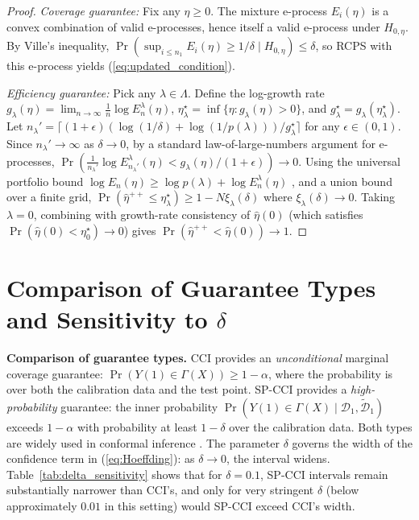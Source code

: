 \documentclass{article}
\theoremstyle{plain}
\theoremstyle{definition}
\theoremstyle{remark}
\begin{document}
\begin{proof}
\emph{Coverage guarantee:}
Fix any $\eta \ge 0$. The mixture e-process $E_i(\eta)$ is a convex combination of valid e-processes, hence itself a valid e-process under $H_{0,\eta}$. By Ville's inequality,
$\Pr\left(\sup_{i \le n_1} E_i(\eta) \ge 1/\delta \mid H_{0,\eta}\right)\le \delta$,
so RCPS with this e-process yields (\ref{eq:updated_condition}).

\emph{Efficiency guarantee:} Pick any $\lambda\in\Lambda$.
Define the log-growth rate $g_\lambda(\eta) = \lim_{n\to\infty}\frac{1}{n}\log E^{\lambda}_n(\eta)$,
$\eta_\lambda^\star = \inf\{ \eta : g_\lambda(\eta) > 0 \}$,
and $g_\lambda^\star = g_\lambda(\eta_\lambda^\star)$.
Let $n_\lambda' = \lceil(1+\epsilon)(\log(1/\delta)+\log(1/p(\lambda)))/g_\lambda^\star\rceil$ for any $\epsilon\in(0,1)$.
Since $n_\lambda'\to\infty$ as $\delta\to 0$, by a standard law-of-large-numbers argument for e-processes,
$\Pr(\frac{1}{n_\lambda'}\log E_{n_\lambda'}^\lambda(\eta) < g_\lambda(\eta)/(1+\epsilon))\to 0$.
Using the universal portfolio bound $\log E_n(\eta)\ge \log p(\lambda)+\log E_n^\lambda(\eta)$ \citep{cover1991universal},
and a union bound over a finite grid, $\Pr(\hat{\eta}^{++}\le \eta_\lambda^\star)\ge 1-N\xi_\lambda(\delta)$ where $\xi_\lambda(\delta)\to 0$.
Taking $\lambda=0$, combining with growth-rate consistency of $\hat\eta(0)$ (which satisfies $\Pr(\hat\eta(0) < \eta_0^\star)\to 0$) gives $\Pr(\hat{\eta}^{++} < \hat{\eta}(0))\to 1$.
\end{proof}


\section{Comparison of Guarantee Types and Sensitivity to $\delta$}
\label{appendix:delta_sensitivity}

\textbf{Comparison of guarantee types.} CCI \citep{lei2021conformal} provides an \emph{unconditional} marginal coverage guarantee: $\Pr(Y(1)\in\Gamma(X))\ge 1-\alpha$, where the probability is over both the calibration data and the test point. SP-CCI provides a \emph{high-probability} guarantee: the inner probability $\Pr(Y(1)\in\Gamma(X)\mid\mathcal{D}_1,\tilde{\mathcal{D}}_1)$ exceeds $1-\alpha$ with probability at least $1-\delta$ over the calibration data. Both types are widely used in conformal inference \citep{bates2021distribution}. The parameter $\delta$ governs the width of the confidence term in (\ref{eq:Hoeffding}): as $\delta\to 0$, the interval widens. Table~\ref{tab:delta_sensitivity} shows that for $\delta=0.1$, SP-CCI intervals remain substantially narrower than CCI's, and only for very stringent $\delta$ (below approximately $0.01$ in this setting) would SP-CCI exceed CCI's width.
\end{document}
